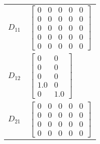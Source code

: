 \begin{tabular}{cl}
 $D_{11}$ & $\left[\begin{matrix}0 & 0 & 0 & 0 & 0\\0 & 0 & 0 & 0 & 0\\0 & 0 & 0 & 0 & 0\\0 & 0 & 0 & 0 & 0\\0 & 0 & 0 & 0 & 0\end{matrix}\right]$                                                     \\
 $D_{12}$ & $\left[\begin{matrix}0 & 0\\0 & 0\\0 & 0\\1.0 & 0\\0 & 1.0\end{matrix}\right]$                                                                                                             \\
 $D_{21}$ & $\left[\begin{matrix}0 & 0 & 0 & 0 & 0\\0 & 0 & 0 & 0 & 0\\0 & 0 & 0 & 0 & 0\\0 & 0 & 0 & 0 & 0\end{matrix}\right]$                                                                        \\
\hline
\end{tabular}